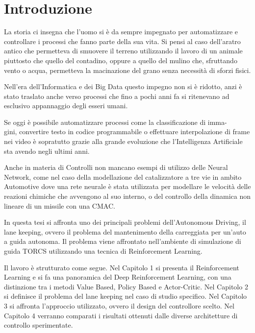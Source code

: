 \chapter*{Introduzione}

La storia ci insegna che l'uomo si è da sempre impegnato per automatizzare e controllare i processi che fanno parte della sua vita. Si pensi al caso dell'aratro antico che permetteva di smuovere il terreno utilizzando il lavoro di un animale piuttosto che quello del contadino, oppure a quello del mulino che, sfruttando vento o acqua, permetteva la macinazione del grano senza necessità di sforzi fisici.

Nell'era dell'Informatica e dei Big Data questo impegno non si è ridotto, anzi è stato traslato anche verso processi che fino a pochi anni fa si ritenevano ad esclusivo appannaggio degli esseri umani.\newline

Se oggi è possibile automatizzare processi come la classificazione di imma-\\gini, convertire testo in codice programmabile o effettuare interpolazione di frame nei video è sopratutto grazie alla grande evoluzione che l'Intelligenza Artificiale sta avendo negli ultimi anni.

Anche in materia di Controlli non mancano esempi di utilizzo delle Neural Network, come nel caso della modellazione del catalizzatore a tre vie in ambito Automotive dove una rete neurale è stata utilizzata per modellare le velocità delle reazioni chimiche che avvengono al suo interno, o del controllo della dinamica non lineare di un missile con una CMAC.\newline

In questa tesi si affronta uno dei principali problemi dell'Autonomous Driving, il lane keeping, ovvero il problema del mantenimento della carreggiata per un'auto a guida autonoma. Il problema viene affrontato nell'ambiente di simulazione di guida TORCS utilizzando una tecnica di Reinforcement Learning.\newline
\clearpage

Il lavoro è strutturato come segue. Nel Capitolo 1 si presenta il Reinforcement Learning e si fa una panoramica del Deep Reinforcement Learning, con una distinzione tra i metodi Value Based, Policy Based e Actor-Critic. Nel Capitolo 2 si definisce il problema del lane keeping nel caso di studio specifico. Nel Capitolo 3 si affronta l'approccio utilizzato, ovvero il design del controllore scelto. Nel Capitolo 4 verranno comparati i risultati ottenuti dalle diverse architetture di controllo sperimentate.